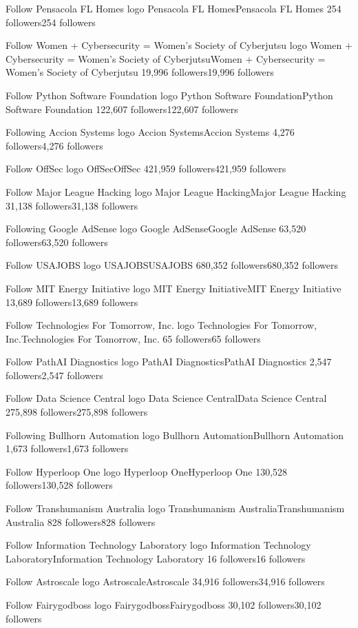 Follow
Pensacola FL Homes logo
Pensacola FL HomesPensacola FL Homes
254 followers254 followers

Follow
Women + Cybersecurity = Women's Society of Cyberjutsu logo
Women + Cybersecurity = Women's Society of CyberjutsuWomen + Cybersecurity = Women's Society of Cyberjutsu
19,996 followers19,996 followers

Follow
Python Software Foundation logo
Python Software FoundationPython Software Foundation
122,607 followers122,607 followers

Following
Accion Systems logo
Accion SystemsAccion Systems
4,276 followers4,276 followers

Follow
OffSec logo
OffSecOffSec
421,959 followers421,959 followers

Follow
Major League Hacking logo
Major League HackingMajor League Hacking
31,138 followers31,138 followers

Following
Google AdSense logo
Google AdSenseGoogle AdSense
63,520 followers63,520 followers

Follow
USAJOBS logo
USAJOBSUSAJOBS
680,352 followers680,352 followers

Follow
MIT Energy Initiative logo
MIT Energy InitiativeMIT Energy Initiative
13,689 followers13,689 followers

Follow
Technologies For Tomorrow, Inc. logo
Technologies For Tomorrow, Inc.Technologies For Tomorrow, Inc.
65 followers65 followers

Follow
PathAI Diagnostics logo
PathAI DiagnosticsPathAI Diagnostics
2,547 followers2,547 followers

Follow
Data Science Central logo
Data Science CentralData Science Central
275,898 followers275,898 followers

Following
Bullhorn Automation logo
Bullhorn AutomationBullhorn Automation
1,673 followers1,673 followers

Follow
Hyperloop One logo
Hyperloop OneHyperloop One
130,528 followers130,528 followers

Follow
Transhumanism Australia logo
Transhumanism AustraliaTranshumanism Australia
828 followers828 followers

Follow
Information Technology Laboratory logo
Information Technology LaboratoryInformation Technology Laboratory
16 followers16 followers

Follow
Astroscale logo
AstroscaleAstroscale
34,916 followers34,916 followers

Follow
Fairygodboss logo
FairygodbossFairygodboss
30,102 followers30,102 followers


